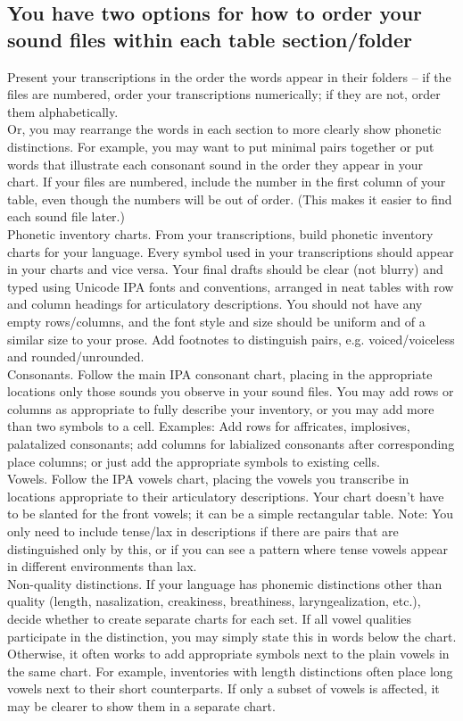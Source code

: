 \documentclass[12pt]{article}
\begin{document}
\subsection*{You have two options for how to order your sound files within each table section/folder}
Present your transcriptions in the order the words appear in their folders – if the files are numbered, order your transcriptions numerically; if they are not, order them alphabetically.\\
Or, you may rearrange the words in each section to more clearly show phonetic distinctions.  For example, you may want to put minimal pairs together or put words that illustrate each consonant sound in the order they appear in your chart.  If your files are numbered, include the number in the first column of your table, even though the numbers will be out of order.  (This makes it easier to find each sound file later.)\\
Phonetic inventory charts.  From your transcriptions, build phonetic inventory charts for your language.  Every symbol used in your transcriptions should appear in your charts and vice versa.  Your final drafts should be clear (not blurry) and typed using Unicode IPA fonts and conventions, arranged in neat tables with row and column headings for articulatory descriptions.  You should not have any empty rows/columns, and the font style and size should be uniform and of a similar size to your prose.  Add footnotes to distinguish pairs, e.g. voiced/voiceless and rounded/unrounded.\\
Consonants.  Follow the main IPA consonant chart, placing in the appropriate locations only those sounds you observe in your sound files.  You may add rows or columns as appropriate to fully describe your inventory, or you may add more than two symbols to a cell.  Examples: Add rows for affricates, implosives, palatalized consonants; add columns for labialized consonants after corresponding place columns; or just add the appropriate symbols to existing cells.\\
Vowels.  Follow the IPA vowels chart, placing the vowels you transcribe in locations appropriate to their articulatory descriptions. Your chart doesn’t have to be slanted for the front vowels; it can be a simple rectangular table.  Note: You only need to include tense/lax in descriptions if there are pairs that are distinguished only by this, or if you can see a pattern where tense vowels appear in different environments than lax.\\
Non-quality distinctions.  If your language has phonemic distinctions other than quality (length, nasalization, creakiness, breathiness, laryngealization, etc.), decide whether to create separate charts for each set.  If all vowel qualities participate in the distinction, you may simply state this in words below the chart.  Otherwise, it often works to add appropriate symbols next to the plain vowels in the same chart.  For example, inventories with length distinctions often place long vowels next to their short counterparts.  If only a subset of vowels is affected, it may be clearer to show them in a separate chart.\\
\end{document}

